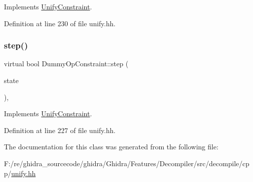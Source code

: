Implements \mbox{\hyperlink{class_unify_constraint_a774f6a611a96384766cb8e8d8f5ff41f}{Unify\+Constraint}}.



Definition at line 230 of file unify.\+hh.

\mbox{\label{class_dummy_op_constraint_a4f2cc27e6d3181b10bf078fb434102a9}} 
\subsubsection{\texorpdfstring{step()}{step()}}
{\footnotesize\ttfamily virtual bool Dummy\+Op\+Constraint\+::step (\begin{DoxyParamCaption}\item[{\mbox{\hyperlink{class_unify_state}{Unify\+State}} \&}]{state }\end{DoxyParamCaption})\hspace{0.3cm}{\ttfamily [inline]}, {\ttfamily [virtual]}}



Implements \mbox{\hyperlink{class_unify_constraint_ad9ab4ad91037f96bf803735d414d212d}{Unify\+Constraint}}.



Definition at line 227 of file unify.\+hh.



The documentation for this class was generated from the following file\+:\begin{DoxyCompactItemize}
\item 
F\+:/re/ghidra\+\_\+sourcecode/ghidra/\+Ghidra/\+Features/\+Decompiler/src/decompile/cpp/\mbox{\hyperlink{unify_8hh}{unify.\+hh}}\end{DoxyCompactItemize}
